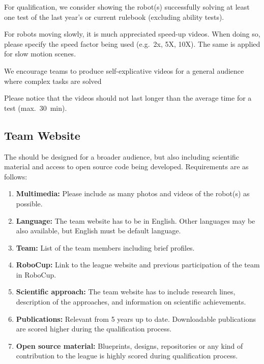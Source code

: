 For qualification, we consider showing the robot(s) successfully solving at least one test of the last year's or current rulebook (excluding ability tests).

For robots moving slowly, it is much appreciated speed-up videos. When doing so, please specify the speed factor being used (e.g.~2x, 5X, 10X). The same is applied for slow motion scenes.

We encourage teams to produce self-explicative videos for a general audience where complex tasks are solved

Please notice that the videos should not last longer than the average time for a test (max.~\SI{30}{\minute}).

\subsection{Team Website}

The  should be designed for a broader audience, but also including scientific material and access to open source code being developed. Requirements are as follows:

\begin{enumerate}

	\item \textbf{Multimedia: } Please include as many photos and videos of the robot(s) as possible.

	\item \textbf{Language: } The team website has to be in English. Other languages may be also available, but English must be default language.

	\item \textbf{Team: } List of the team members including brief profiles.

	\item \textbf{RoboCup:} Link to the league website and previous participation of the team in RoboCup.

	\item \textbf{Scientific approach: } The team website has to include research lines, description of the approaches, and information on scientific achievements.

	\item \textbf{Publications: } Relevant  from 5 years up to date. Downloadable publications are scored higher during the qualification process.

	\item \textbf{Open source material: } Blueprints, designs, repositories or any kind of contribution to the league is highly scored during qualification process.
\end{enumerate}


